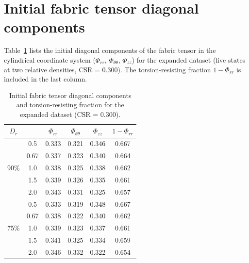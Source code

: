 \section{Initial fabric tensor diagonal components}
\label{sec:appendix_fabric}

Table~\ref{tab:fabric_diagonal} lists the initial diagonal components of the fabric tensor in the cylindrical coordinate system ($\Phi_{rr}$, $\Phi_{\theta\theta}$, $\Phi_{zz}$) for the expanded dataset (five \Kzero{} states at two relative densities, CSR = 0.300). The torsion-resisting fraction $1 - \Phi_{rr}$ is included in the last column.

\begin{table}[h]
\centering
\caption{Initial fabric tensor diagonal components and torsion-resisting fraction for the expanded dataset (CSR = 0.300).}
\label{tab:fabric_diagonal}
\small
\begin{tabular}{cccccc}
\toprule
$D_r$ & \Kzero{} & $\Phi_{rr}$ & $\Phi_{\theta\theta}$ & $\Phi_{zz}$ & $1-\Phi_{rr}$ \\
\midrule
\multirow{5}{*}{90\%}
& 0.5  & 0.333 & 0.321 & 0.346 & 0.667 \\
& 0.67 & 0.337 & 0.323 & 0.340 & 0.664 \\
& 1.0  & 0.338 & 0.325 & 0.338 & 0.662 \\
& 1.5  & 0.339 & 0.326 & 0.335 & 0.661 \\
& 2.0  & 0.343 & 0.331 & 0.325 & 0.657 \\
\midrule
\multirow{5}{*}{75\%}
& 0.5  & 0.333 & 0.319 & 0.348 & 0.667 \\
& 0.67 & 0.338 & 0.322 & 0.340 & 0.662 \\
& 1.0  & 0.339 & 0.323 & 0.337 & 0.661 \\
& 1.5  & 0.341 & 0.325 & 0.334 & 0.659 \\
& 2.0  & 0.346 & 0.332 & 0.322 & 0.654 \\
\bottomrule
\end{tabular}
\end{table}
